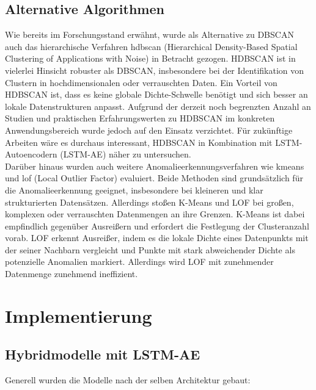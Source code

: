 \documentclass[a4paper,12pt]{article}
\begin{document}
	\subsection{Alternative Algorithmen}
	Wie bereits im Forschungsstand erwähnt, wurde als Alternative zu DBSCAN auch das hierarchische Verfahren \gls{hdbscan} (Hierarchical Density-Based Spatial Clustering of Applications with Noise) in Betracht gezogen. HDBSCAN ist in vielerlei Hinsicht robuster als DBSCAN, insbesondere bei der Identifikation von Clustern in hochdimensionalen oder verrauschten Daten. Ein Vorteil von HDBSCAN ist, dass es keine globale Dichte-Schwelle benötigt und sich besser an lokale Datenstrukturen anpasst. Aufgrund der derzeit noch begrenzten Anzahl an Studien und praktischen Erfahrungswerten zu HDBSCAN im konkreten Anwendungsbereich wurde jedoch auf den Einsatz verzichtet. Für zukünftige Arbeiten wäre es durchaus interessant, HDBSCAN in Kombination mit LSTM-Autoencodern (LSTM-AE) näher zu untersuchen.
	\\[0.5em]
	Darüber hinaus wurden auch weitere Anomalieerkennungsverfahren wie \gls{kmeans} und \gls{lof} (Local Outlier Factor) evaluiert. Beide Methoden sind grundsätzlich für die Anomalieerkennung geeignet, insbesondere bei kleineren und klar strukturierten Datensätzen. Allerdings stoßen K-Means und LOF bei großen, komplexen oder verrauschten Datenmengen an ihre Grenzen. K-Means ist dabei empfindlich gegenüber Ausreißern und erfordert die Festlegung der Clusteranzahl vorab. LOF erkennt Ausreißer, indem es die lokale Dichte eines Datenpunkts mit der seiner Nachbarn vergleicht und Punkte mit stark abweichender Dichte als potenzielle Anomalien markiert. Allerdings wird LOF mit zunehmender Datenmenge zunehmend ineffizient.
	
	\section{Implementierung}
	\subsection{Hybridmodelle mit LSTM-AE}
	Generell wurden die Modelle nach der selben Architektur gebaut:
	
\end{document}
